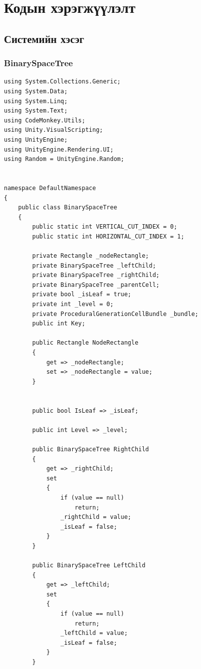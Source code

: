 
\appendix
{}

\chapter{Кодын хэрэгжүүлэлт}
\section{Системийн хэсэг}
\subsection{BinarySpaceTree}
\begin{lstlisting}[language={[Sharp]C}, frame=single, caption=BinarySpaceTree хэрэгжүүлэлт]
using System.Collections.Generic;
using System.Data;
using System.Linq;
using System.Text;
using CodeMonkey.Utils;
using Unity.VisualScripting;
using UnityEngine;
using UnityEngine.Rendering.UI;
using Random = UnityEngine.Random;


namespace DefaultNamespace
{
    public class BinarySpaceTree
    {
        public static int VERTICAL_CUT_INDEX = 0;
        public static int HORIZONTAL_CUT_INDEX = 1;

        private Rectangle _nodeRectangle;
        private BinarySpaceTree _leftChild;
        private BinarySpaceTree _rightChild;
        private BinarySpaceTree _parentCell;
        private bool _isLeaf = true;
        private int _level = 0;
        private ProceduralGenerationCellBundle _bundle;
        public int Key;

        public Rectangle NodeRectangle
        {
            get => _nodeRectangle;
            set => _nodeRectangle = value;
        }


        public bool IsLeaf => _isLeaf;

        public int Level => _level;

        public BinarySpaceTree RightChild
        {
            get => _rightChild;
            set
            {
                if (value == null)
                    return;
                _rightChild = value;
                _isLeaf = false;
            }
        }

        public BinarySpaceTree LeftChild
        {
            get => _leftChild;
            set
            {
                if (value == null)
                    return;
                _leftChild = value;
                _isLeaf = false;
            }
        }


\end{lstlisting}
